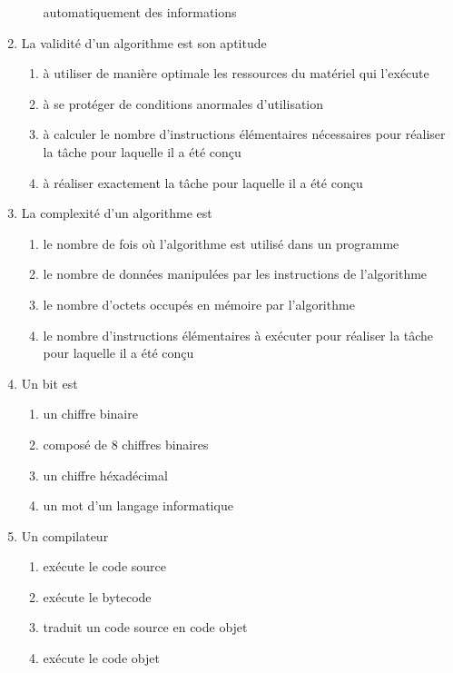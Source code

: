 \begin{td}[QCM (1)]
\begin{enumerate}
\begin{enumerate}
		automatiquement des informations
	\end{enumerate}
\item La validité d'un algorithme est son aptitude
	\begin{enumerate}
	\item à utiliser de manière optimale les ressources du matériel qui l'exécute
	\item à se protéger de conditions anormales d'utilisation
	\item à calculer le nombre d'instructions élémentaires nécessaires pour
		réaliser la tâche pour laquelle il a été conçu
	\item à réaliser exactement la tâche pour laquelle il a été conçu
	\end{enumerate}
\item La complexité d'un algorithme est
	\begin{enumerate}
	\item le nombre de fois où l'algorithme est utilisé dans un programme
	\item le nombre de données manipulées par les instructions de
		l'algorithme
	\item le nombre d'octets occupés en mémoire par l'algorithme
	\item le nombre d'instructions élémentaires à exécuter pour
		réaliser la tâche pour laquelle il a été conçu
	\end{enumerate}
\item Un bit est 
	\begin{enumerate}
	\item un chiffre binaire
	\item composé de 8 chiffres binaires
	\item un chiffre héxadécimal
	\item un mot d'un langage informatique
	\end{enumerate}
\item Un compilateur 
	\begin{enumerate}
	\item exécute le code source
	\item exécute le bytecode
	\item traduit un code source en code objet
	\item exécute le code objet
	\end{enumerate}
\end{enumerate}
\end{td}

